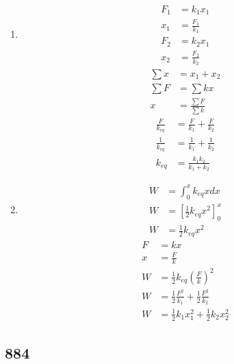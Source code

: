 \documentclass{article}
\begin{document}
\begin{enumerate}[label = \textbf{(\alph*)}]
	\item
		\begin{align*}
			F_1 & = k_1x_1 \\
			x_1 & = \frac{F_1}{k_1} \\
			F_2 & = k_2x_1 \\
			x_2 & = \frac{F_2}{k_2}
		\end{align*}
		\begin{align*}
			\sum x & = x_1 + x_2 \\
			\sum F & = \sum k x \\
			x & = \frac{\sum F}{\sum k}
		\end{align*}
		\begin{align*}
			\frac{F}{k_{eq}} & = \frac{F}{k_1} + \frac{F}{k_2} \\
			\frac{1}{k_{eq}} & = \frac{1}{k_1} + \frac{1}{k_2} \\
			k_{eq} & = \frac{k_1k_2}{k_1 + k_2}
		\end{align*}
	\item
		\begin{align*}
			W & = \int_0^x k_{eq}x dx \\
			W & = \left[ \frac{1}{2}k_{eq}x^2 \right]_0^x \\
			W & = \frac{1}{2}k_{eq}x^2
		\end{align*}
		\begin{align*}
			F & = kx \\
			x & = \frac{F}{k} \\
			W & = \frac{1}{2}k_{eq} \left( \frac{F}{k} \right)^2 \\
			W & = \frac{1}{2}\frac{F^2}{k_1} + \frac{1}{2}\frac{F^2}{k_2} \\
			W & = \frac{1}{2}k_1x_1^2 + \frac{1}{2}k_2x_2^2
		\end{align*}
\end{enumerate}

\subsection{884}
\end{document}
